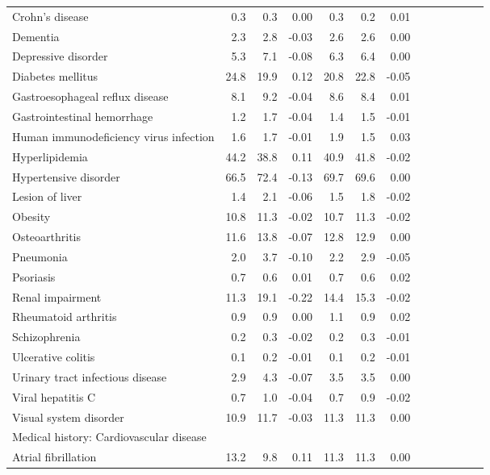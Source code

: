 \documentclass[11pt,]{article}
\begin{document}
\begin{longtable}{lrrrrrrrrrrrr}
      Crohn's disease &  0.3 &  0.3 &  0.00 &  0.3 &  0.2 &  0.01 \\ 
      Dementia &  2.3 &  2.8 & -0.03 &  2.6 &  2.6 &  0.00 \\ 
      Depressive disorder &  5.3 &  7.1 & -0.08 &  6.3 &  6.4 &  0.00 \\ 
      Diabetes mellitus & 24.8 & 19.9 &  0.12 & 20.8 & 22.8 & -0.05 \\ 
      Gastroesophageal reflux disease &  8.1 &  9.2 & -0.04 &  8.6 &  8.4 &  0.01 \\ 
      Gastrointestinal hemorrhage &  1.2 &  1.7 & -0.04 &  1.4 &  1.5 & -0.01 \\ 
      Human immunodeficiency virus infection &  1.6 &  1.7 & -0.01 &  1.9 &  1.5 &  0.03 \\ 
      Hyperlipidemia & 44.2 & 38.8 &  0.11 & 40.9 & 41.8 & -0.02 \\ 
      Hypertensive disorder & 66.5 & 72.4 & -0.13 & 69.7 & 69.6 &  0.00 \\ 
      Lesion of liver &  1.4 &  2.1 & -0.06 &  1.5 &  1.8 & -0.02 \\ 
      Obesity & 10.8 & 11.3 & -0.02 & 10.7 & 11.3 & -0.02 \\ 
      Osteoarthritis & 11.6 & 13.8 & -0.07 & 12.8 & 12.9 &  0.00 \\ 
      Pneumonia &  2.0 &  3.7 & -0.10 &  2.2 &  2.9 & -0.05 \\ 
      Psoriasis &  0.7 &  0.6 &  0.01 &  0.7 &  0.6 &  0.02 \\ 
      Renal impairment & 11.3 & 19.1 & -0.22 & 14.4 & 15.3 & -0.02 \\ 
      Rheumatoid arthritis &  0.9 &  0.9 &  0.00 &  1.1 &  0.9 &  0.02 \\ 
      Schizophrenia &  0.2 &  0.3 & -0.02 &  0.2 &  0.3 & -0.01 \\ 
      Ulcerative colitis &  0.1 &  0.2 & -0.01 &  0.1 &  0.2 & -0.01 \\ 
      Urinary tract infectious disease &  2.9 &  4.3 & -0.07 &  3.5 &  3.5 &  0.00 \\ 
      Viral hepatitis C &  0.7 &  1.0 & -0.04 &  0.7 &  0.9 & -0.02 \\ 
      Visual system disorder & 10.9 & 11.7 & -0.03 & 11.3 & 11.3 &  0.00 \\ 
  Medical history: Cardiovascular disease &    &    &     &    &    &     \\ 
      Atrial fibrillation & 13.2 &  9.8 &  0.11 & 11.3 & 11.3 &  0.00 \\ 

\end{longtable}
\end{document}

